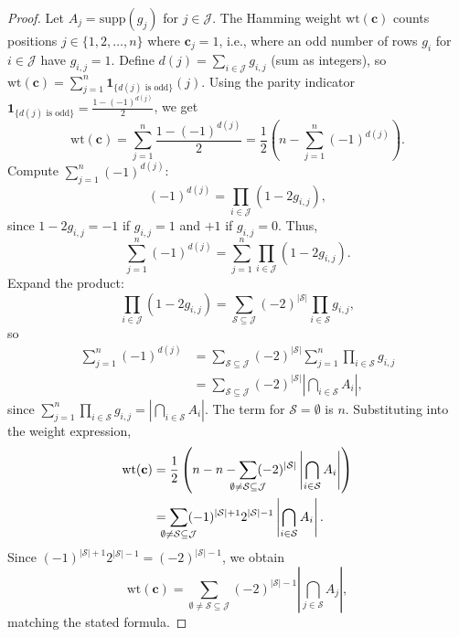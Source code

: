 \documentclass[10pt,a4paper]{amsart}
\begin{document}
\begin{proof}
Let $A_j = \mathrm{supp}(g_j)$ for $j \in \mathcal{J}$. The Hamming weight $\mathrm{wt}(\mathbf{c})$ counts positions $j \in \{1,2,\dots,n\}$ where $\mathbf{c}_j = 1$, i.e., where an odd number of rows $g_i$ for $i \in \mathcal{J}$ have $g_{i,j} = 1$. Define $d(j) = \sum_{i \in \mathcal{J}} g_{i,j}$ (sum as integers), so $\mathrm{wt}(\mathbf{c}) = \sum_{j=1}^n \mathbf{1}_{\{d(j) \text{ is odd}\}}(j)$. Using the parity indicator $\mathbf{1}_{\{d(j) \text{ is odd}\}} = \frac{1 - (-1)^{d(j)}}{2}$, we get
\[
\mathrm{wt}(\mathbf{c}) = \sum_{j=1}^n \frac{1 - (-1)^{d(j)}}{2} = \frac{1}{2} \left( n - \sum_{j=1}^n (-1)^{d(j)} \right).
\]
Compute $\sum_{j=1}^n (-1)^{d(j)}$:
\[
(-1)^{d(j)} = \prod_{i \in \mathcal{J}} (1 - 2 g_{i,j}),
\]
since $1 - 2 g_{i,j} = -1$ if $g_{i,j} = 1$ and $+1$ if $g_{i,j} = 0$. Thus,
\[
\sum_{j=1}^n (-1)^{d(j)} = \sum_{j=1}^n \prod_{i \in \mathcal{J}} (1 - 2 g_{i,j}).
\]
Expand the product:
\[
\prod_{i \in \mathcal{J}} (1 - 2 g_{i,j}) = \sum_{\mathcal{S} \subseteq \mathcal{J}} (-2)^{|\mathcal{S}|} \prod_{i \in \mathcal{S}} g_{i,j},
\]
so
\[
\begin{aligned}
\sum_{j=1}^n (-1)^{d(j)} &= \sum_{\mathcal{S} \subseteq \mathcal{J}} (-2)^{|\mathcal{S}|} \sum_{j=1}^n \prod_{i \in \mathcal{S}} g_{i,j} \\&= \sum_{\mathcal{S} \subseteq \mathcal{J}} (-2)^{|\mathcal{S}|} \left| \bigcap_{i \in \mathcal{S}} A_i \right|,
\end{aligned}
\]
since $\sum_{j=1}^n \prod_{i \in \mathcal{S}} g_{i,j} = |\bigcap_{i \in \mathcal{S}} A_i|$. The term for $\mathcal{S} = \emptyset$ is $n$. Substituting into the weight expression,
\[
\begin{aligned}
\mathrm{wt}(\mathbf{c}) &= \frac{1}{2} \left( n - n - \sum_{\mathclap{\emptyset \neq \mathcal{S} \subseteq \mathcal{J}}} (-2)^{|\mathcal{S}|} \left| \bigcap_{i \in \mathcal{S}} A_i \right| \right) \\&= \sum_{\mathclap{\emptyset \neq \mathcal{S} \subseteq \mathcal{J}}} (-1)^{|\mathcal{S}|+1} 2^{|\mathcal{S}|-1} \left| \bigcap_{i \in \mathcal{S}} A_i \right|.
\end{aligned}
\]
Since $(-1)^{|\mathcal{S}|+1} 2^{|\mathcal{S}|-1} = (-2)^{|\mathcal{S}|-1}$, we obtain
\[
\mathrm{wt}(\mathbf{c}) = \sum_{\emptyset \neq \mathcal{S} \subseteq \mathcal{J}} (-2)^{|\mathcal{S}|-1} \left| \bigcap_{j \in \mathcal{S}} A_j \right|,
\]
matching the stated formula.
\end{proof}
\end{document}
